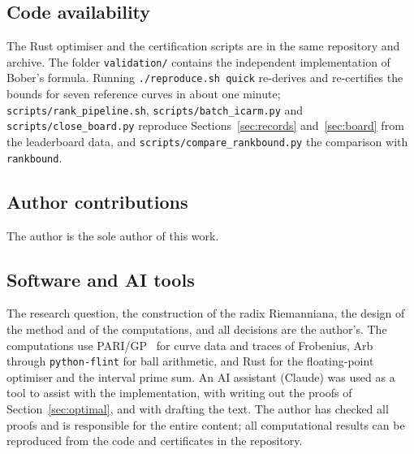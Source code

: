 \documentclass[11pt]{amsart}
\theoremstyle{remark}
\theoremstyle{definition}
\begin{document}
\subsection*{Code availability} The Rust optimiser and the certification scripts are in the same repository and archive. The folder \texttt{validation/} contains the independent implementation of Bober's formula. Running \texttt{./reproduce.sh quick} re-derives and re-certifies the bounds for seven reference curves in about one minute; \texttt{scripts/rank\_pipeline.sh}, \texttt{scripts/batch\_icarm.py} and \texttt{scripts/close\_board.py} reproduce Sections~\ref{sec:records} and~\ref{sec:board} from the leaderboard data, and \texttt{scripts/compare\_rankbound.py} the comparison with \texttt{rankbound}.

\subsection*{Author contributions} The author is the sole author of this work.

\subsection*{Software and AI tools} The research question, the construction of the radix Riemanniana, the design of the method and of the computations, and all decisions are the author's. The computations use PARI/GP~\cite{PARI} for curve data and traces of Frobenius, Arb~\cite{Arb} through \texttt{python-flint} for ball arithmetic, and Rust for the floating-point optimiser and the interval prime sum. An AI assistant (Claude) was used as a tool to assist with the implementation, with writing out the proofs of Section~\ref{sec:optimal}, and with drafting the text. The author has checked all proofs and is responsible for the entire content; all computational results can be reproduced from the code and certificates in the repository.
\end{document}
